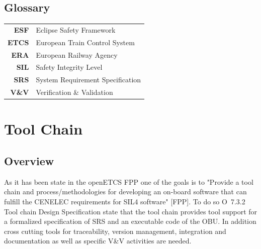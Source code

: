 \documentclass{template/openetcs_report}
\begin{document}

\section{Glossary}
\label{sec:glossary}



\begin{tabular}{rl}
\textbf{ESF} & Eclipse Safety Framework \\ 
\textbf{ETCS} & European Train Control System \\ 
\textbf{ERA} & European Railway Agency \\ 
\textbf{SIL} & Safety Integrity Level \\ 
\textbf{SRS} & System Requirement Specification \\ 
\textbf{V\&V} & Verification \& Validation \\ 
\end{tabular} 






\chapter{Tool Chain}
\label{toolchain}
\section{Overview}

As it has been state in the openETCS FPP one of the goals  is to "Provide a tool chain and process/methodologies for developing an on-board software that can fulfill the CENELEC requirements for SIL4 software" [FPP]. To do so O~7.3.2 Tool chain Design Specification state that the tool chain  provides tool support for a formalized specification of SRS and an executable code of the OBU. In addition cross cutting tools for traceability, version management, integration and documentation as well as specific V\&V activities are needed.
\end{document}
